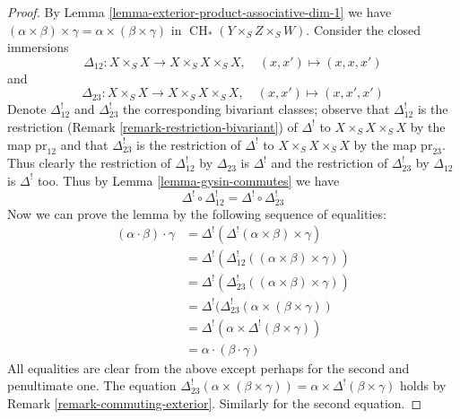 \documentclass[10pt,a4paper]{amsart}
\theoremstyle{plain}
\theoremstyle{definition}
\theoremstyle{remark}
\numberwithin{equation}{subsection}
\def\CH{\mathop{\mathrm{CH}}\nolimits}
\begin{document}
\begin{proof}
By Lemma \ref{lemma-exterior-product-associative-dim-1} we have
$(\alpha \times \beta) \times \gamma =
\alpha \times (\beta \times \gamma)$ in $\CH_*(Y \times_S Z \times_S W)$.
Consider the closed immersions
$$
\Delta_{12} : X \times_S X \longrightarrow X \times_S X \times_S X,
\quad (x, x') \mapsto (x, x, x')
$$
and
$$
\Delta_{23} : X \times_S X \longrightarrow X \times_S X \times_S X,
\quad (x, x') \mapsto (x, x', x')
$$
Denote $\Delta_{12}^!$ and $\Delta_{23}^!$ the corresponding bivariant
classes; observe that $\Delta_{12}^!$ is the restriction
(Remark \ref{remark-restriction-bivariant}) of $\Delta^!$
to $X \times_S X \times_S X$ by the map $\text{pr}_{12}$ and that
$\Delta_{23}^!$ is the restriction of $\Delta^!$
to $X \times_S X \times_S X$ by the map $\text{pr}_{23}$.
Thus clearly the restriction of $\Delta_{12}^!$ by $\Delta_{23}$
is $\Delta^!$ and the restriction of $\Delta_{23}^!$ by $\Delta_{12}$ is
$\Delta^!$ too. Thus by Lemma \ref{lemma-gysin-commutes} we have
$$
\Delta^! \circ \Delta_{12}^! =
\Delta^! \circ \Delta_{23}^! 
$$
Now we can prove the lemma by the following sequence of equalities:
\begin{align*}
(\alpha \cdot \beta) \cdot \gamma
& =
\Delta^!(\Delta^!(\alpha \times \beta) \times \gamma) \\
& =
\Delta^!(\Delta_{12}^!((\alpha \times \beta) \times \gamma)) \\
& =
\Delta^!(\Delta_{23}^!((\alpha \times \beta) \times \gamma)) \\
& =
\Delta^!(\Delta_{23}^!(\alpha \times (\beta \times \gamma)) \\
& =
\Delta^!(\alpha \times \Delta^!(\beta \times \gamma)) \\
& =
\alpha \cdot (\beta \cdot \gamma)
\end{align*}
All equalities are clear from the above except perhaps
for the second and penultimate one. The equation
$\Delta_{23}^!(\alpha \times (\beta \times \gamma)) =
\alpha \times \Delta^!(\beta \times \gamma)$ holds by
Remark \ref{remark-commuting-exterior}. Similarly for the second
equation.
\end{proof}
\end{document}
